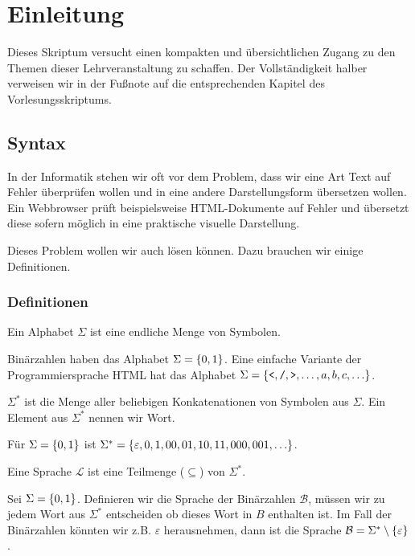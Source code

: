 \chapter{Einleitung}

Dieses Skriptum versucht einen kompakten und übersichtlichen Zugang zu den Themen
dieser Lehrveranstaltung zu schaffen. Der Vollständigkeit halber verweisen wir in der Fußnote auf die
entsprechenden Kapitel des Vorlesungsskriptums.

\section{Syntax}
In der Informatik stehen wir oft vor dem Problem, dass wir eine Art Text auf
Fehler überprüfen wollen und in eine andere Darstellungsform übersetzen wollen.
Ein Webbrowser prüft beispielsweise HTML-Dokumente auf Fehler und übersetzt diese
sofern möglich in eine praktische visuelle Darstellung.

Dieses Problem wollen wir auch lösen können. Dazu brauchen wir einige Definitionen.

\subsection{Definitionen}
\begin{defn}[Alphabet]
Ein Alphabet $\Sigma$ ist eine endliche Menge von Symbolen.
\end{defn}

Binärzahlen haben das Alphabet $\Sigma=\left\{0,1\right\}$.
Eine einfache Variante der Programmiersprache HTML hat das Alphabet $\Sigma=\left\{\texttt{<},\texttt{/},\texttt{>},\ldots,a,b,c,\ldots\right\}$.

\begin{defn}
$\Sigma^*$ ist die Menge aller beliebigen Konkatenationen von Symbolen aus $\Sigma$.
Ein Element aus $\Sigma^*$ nennen wir Wort.
\end{defn}

Für $\Sigma=\left\{0,1\right\}$ ist $\Sigma^*=\left\{\varepsilon,0,1,00,01,10,11,000,001,\ldots\right\}$.

\begin{defn}[Sprache]
Eine Sprache $\mathcal{L}$ ist eine Teilmenge ($\subseteq$) von $\Sigma^*$.
\end{defn}

Sei $\Sigma=\left\{0,1\right\}$. Definieren wir die Sprache der Binärzahlen $\mathcal{B}$,
müssen wir zu jedem Wort aus $\Sigma^*$ entscheiden ob dieses Wort in $B$ enthalten ist.
Im Fall der Binärzahlen könnten wir z.B. $\varepsilon$ herausnehmen, dann ist die Sprache
$\mathcal{B}=\Sigma^* \setminus \left\{\varepsilon\right\}$.

